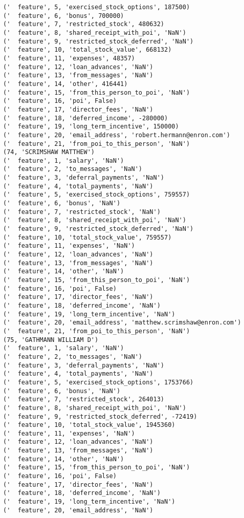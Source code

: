 \begin{verbatim}
('  feature', 5, 'exercised_stock_options', 187500)
('  feature', 6, 'bonus', 700000)
('  feature', 7, 'restricted_stock', 480632)
('  feature', 8, 'shared_receipt_with_poi', 'NaN')
('  feature', 9, 'restricted_stock_deferred', 'NaN')
('  feature', 10, 'total_stock_value', 668132)
('  feature', 11, 'expenses', 48357)
('  feature', 12, 'loan_advances', 'NaN')
('  feature', 13, 'from_messages', 'NaN')
('  feature', 14, 'other', 416441)
('  feature', 15, 'from_this_person_to_poi', 'NaN')
('  feature', 16, 'poi', False)
('  feature', 17, 'director_fees', 'NaN')
('  feature', 18, 'deferred_income', -280000)
('  feature', 19, 'long_term_incentive', 150000)
('  feature', 20, 'email_address', 'robert.hermann@enron.com')
('  feature', 21, 'from_poi_to_this_person', 'NaN')
(74, 'SCRIMSHAW MATTHEW')
('  feature', 1, 'salary', 'NaN')
('  feature', 2, 'to_messages', 'NaN')
('  feature', 3, 'deferral_payments', 'NaN')
('  feature', 4, 'total_payments', 'NaN')
('  feature', 5, 'exercised_stock_options', 759557)
('  feature', 6, 'bonus', 'NaN')
('  feature', 7, 'restricted_stock', 'NaN')
('  feature', 8, 'shared_receipt_with_poi', 'NaN')
('  feature', 9, 'restricted_stock_deferred', 'NaN')
('  feature', 10, 'total_stock_value', 759557)
('  feature', 11, 'expenses', 'NaN')
('  feature', 12, 'loan_advances', 'NaN')
('  feature', 13, 'from_messages', 'NaN')
('  feature', 14, 'other', 'NaN')
('  feature', 15, 'from_this_person_to_poi', 'NaN')
('  feature', 16, 'poi', False)
('  feature', 17, 'director_fees', 'NaN')
('  feature', 18, 'deferred_income', 'NaN')
('  feature', 19, 'long_term_incentive', 'NaN')
('  feature', 20, 'email_address', 'matthew.scrimshaw@enron.com')
('  feature', 21, 'from_poi_to_this_person', 'NaN')
(75, 'GATHMANN WILLIAM D')
('  feature', 1, 'salary', 'NaN')
('  feature', 2, 'to_messages', 'NaN')
('  feature', 3, 'deferral_payments', 'NaN')
('  feature', 4, 'total_payments', 'NaN')
('  feature', 5, 'exercised_stock_options', 1753766)
('  feature', 6, 'bonus', 'NaN')
('  feature', 7, 'restricted_stock', 264013)
('  feature', 8, 'shared_receipt_with_poi', 'NaN')
('  feature', 9, 'restricted_stock_deferred', -72419)
('  feature', 10, 'total_stock_value', 1945360)
('  feature', 11, 'expenses', 'NaN')
('  feature', 12, 'loan_advances', 'NaN')
('  feature', 13, 'from_messages', 'NaN')
('  feature', 14, 'other', 'NaN')
('  feature', 15, 'from_this_person_to_poi', 'NaN')
('  feature', 16, 'poi', False)
('  feature', 17, 'director_fees', 'NaN')
('  feature', 18, 'deferred_income', 'NaN')
('  feature', 19, 'long_term_incentive', 'NaN')
('  feature', 20, 'email_address', 'NaN')

\end{verbatim}
